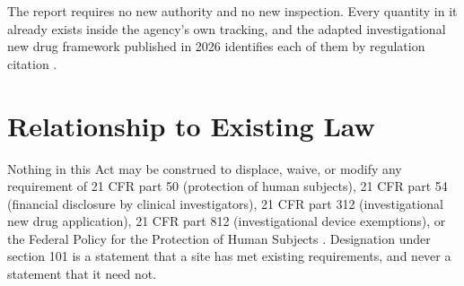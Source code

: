 The report requires no new authority and no new inspection. Every quantity in it
already exists inside the agency's own tracking, and the adapted investigational
new drug framework published in 2026 identifies each of them by regulation
citation \cite{cfr312adapt,cfr312}.

\section{Relationship to Existing Law}

Nothing in this Act may be construed to displace, waive, or modify any
requirement of 21 CFR part 50 (protection of human subjects), 21 CFR part 54
(financial disclosure by clinical investigators), 21 CFR part 312
(investigational new drug application), 21 CFR part 812 (investigational device
exemptions), or the Federal Policy for the Protection of Human Subjects
\cite{cfr50,cfr54,cfr312,cfr812,cfr45part46}. Designation under section 101 is a
statement that a site has met existing requirements, and never a statement that
it need not.
